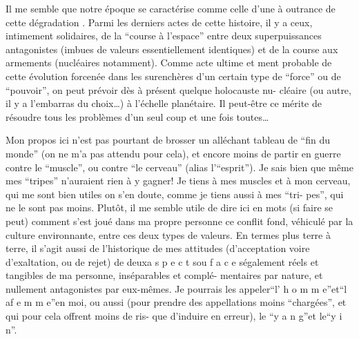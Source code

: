 Il me semble que notre époque se caractérise comme celle d'une 
à outrance de cette dégradation . Parmi les derniers actes de cette
histoire, il y a ceux, intimement solidaires, de la ``course à l'espace'' entre 
deux superpuissances antagonistes (imbues de valeurs essentiellement identiques)
et de la course aux armements (nucléaires notamment). Comme acte ultime et \newline
ment probable de cette évolution forcenée dans les surenchères d'un certain type
de ``force'' ou de ``pouvoir'', on peut prévoir dès à présent quelque holocauste nu-\newline
cléaire (ou autre, il y a l'embarras du choix\ldots) à l'échelle planétaire. Il 
peut-être ce mérite de résoudre tous les problèmes d'un seul coup et une fois 
toutes\ldots

Mon propos ici n'est pas pourtant de brosser un alléchant tableau de ``fin
du monde'' (on ne m'a pas attendu pour cela), et encore moins de partir en guerre
contre le ``muscle'', ou contre ``le cerveau'' (alias l'``esprit''). Je sais bien que
même mes ``tripes'' n'auraient rien à y gagner! Je tiens à mes muscles et à mon
cerveau, qui me sont bien utiles on s'en doute, comme je tiens aussi à mes ``tri-\newline
pes'', qui ne le sont pas moins. Plutôt, il me semble utile de dire ici en 
mots (si faire se peut) comment s'est joué dans ma propre personne ce conflit \newline
fond, véhiculé par la culture environnante, entre ces deux types de valeurs. En
termes plus terre à terre, il s'agit aussi de l'historique de mes attitudes
(d'acceptation voire d'exaltation, ou de rejet) de deux\quad a s p e c t s\quad ou
f a c e s\quad également réels et tangibles de ma personne, inséparables et complé-\newline
mentaires par nature, et nullement antagonistes par eux-mêmes. Je pourrais les
appeler\quad ``l' h o m m e''\quad et\quad ``l a\quad f e m m e''\quad en moi, ou aussi (pour
prendre des appellations moins ``chargées'', et qui pour cela offrent moins de ris-\newline
que d'induire en erreur), le ``y a n g''\quad et le\quad ``y i n''.

